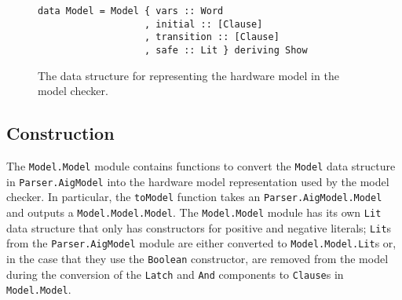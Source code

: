 \documentclass[12pt,a4paper,twoside,openright]{report}
\begin{document}
{\begin{figure}[H]
\centering
\begin{verbatim}
data Model = Model { vars :: Word
                   , initial :: [Clause]
                   , transition :: [Clause]
                   , safe :: Lit } deriving Show
\end{verbatim}
\caption{The data structure for representing the hardware model in the model checker.}
\end{figure}

\subsection{Construction}

The \verb,Model.Model, module contains functions to convert the \verb,Model, data
structure in \verb,Parser.AigModel, into the hardware model representation used by
the model checker. In particular, the \verb,toModel, function takes an \verb,Parser.AigModel.Model,
and outputs a \verb,Model.Model.Model,. The \verb,Model.Model, module has its own \verb,Lit,
data structure that only has constructors for positive and negative literals; \verb,Lit,s from
the \verb,Parser.AigModel, module are either converted to \verb,Model.Model.Lit,s or, in the case
that they use the \verb,Boolean, constructor, are removed from the model during the conversion of
the \verb,Latch, and \verb,And, components to \verb,Clause,s in \verb,Model.Model,.

}
\end{document}

